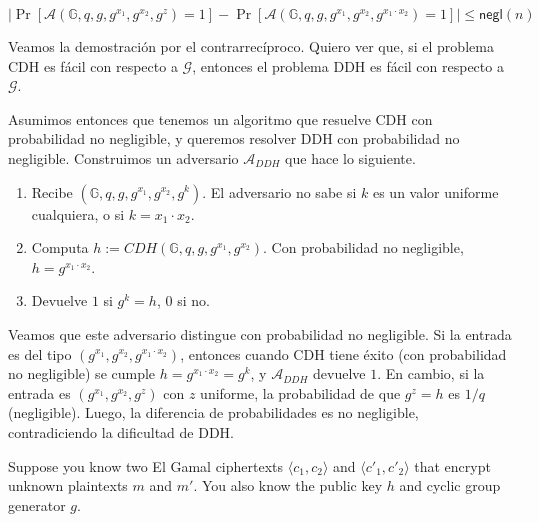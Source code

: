 \documentclass[12pt,addpoints,answers]{exam}
\begin{document}
\begin{questions}
\begin{solution}
  $$\left| \Pr[\mathcal{A}(\mathbb{G}, q, g, g^{x_1}, g^{x_2}, g^z) = 1] - \Pr[\mathcal{A}(\mathbb{G}, q, g, g^{x_1}, g^{x_2}, g^{x_1\cdot x_2}) = 1] \right| \leq \mathsf{negl}(n)$$

   Veamos la demostración por el contrarrecíproco. Quiero ver que, si el problema CDH es fácil con respecto a $\mathcal{G}$, entonces el problema DDH es fácil con respecto a $\mathcal{G}$. 

   Asumimos entonces que tenemos un algoritmo que resuelve CDH con probabilidad no negligible, y queremos resolver DDH con probabilidad no negligible.
   Construimos un adversario $\mathscr{A}_{DDH}$ que hace lo siguiente.
   \begin{enumerate}
    \item Recibe $(\mathbb{G}, q, g, g^{x_1}, g^{x_2}, g^k)$. El adversario no sabe si $k$ es un valor uniforme cualquiera, o si $k = x_1 \cdot x_2$.
    \item Computa $h := CDH(\mathbb{G}, q, g, g^{x_1}, g^{x_2})$. Con probabilidad no negligible, $h = g^{x_1 \cdot x_2}$.
    \item Devuelve $1$ si $g^k = h$, $0$ si no.
   \end{enumerate}

   Veamos que este adversario distingue con probabilidad no negligible. Si la entrada es del tipo $(g^{x_1}, g^{x_2}, g^{x_1 \cdot x_2})$, entonces cuando CDH tiene éxito (con probabilidad no negligible) se cumple $h = g^{x_1 \cdot x_2} = g^k$, y $\mathscr{A}_{DDH}$ devuelve $1$. En cambio, si la entrada es $(g^{x_1}, g^{x_2}, g^z)$ con $z$ uniforme, la probabilidad de que $g^z = h$ es $1/q$ (negligible). Luego, la diferencia de probabilidades es no negligible, contradiciendo la dificultad de DDH.

\end{solution}


\question Suppose you know two El Gamal ciphertexts $\langle c_1,c_2\rangle$ and $\langle c'_1,c'_2\rangle$ that encrypt unknown plaintexts $m$ and $m'$. You also know the public key $h$ and cyclic group generator $g$.
\end{questions}
\end{document}

